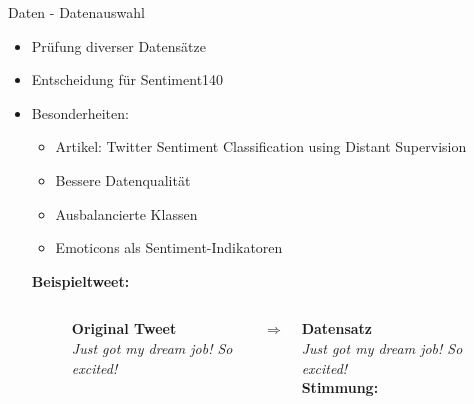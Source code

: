 \documentclass[aspectratio=169]{beamer}
\begin{document}
\begin{frame}{Daten - Datenauswahl}
	\begin{itemize}
		\item Prüfung diverser Datensätze
		\item Entscheidung für \glqq Sentiment140\grqq
		\item Besonderheiten:
		      \begin{itemize}
			      \item Artikel: \glqq Twitter Sentiment Classification using Distant Supervision\grqq
			      \item Bessere Datenqualität
			      \item Ausbalancierte Klassen
			      \item Emoticons als Sentiment-Indikatoren
		      \end{itemize}

		      \vspace{0.5cm}
		      \textbf{Beispieltweet:}
		      \vspace{0.2cm}

		      \begin{figure}
			      \centering
			      \begin{columns}[T]
				      \begin{column}{0.45\textwidth}
					      \centering
					      \textbf{Original Tweet}\\
					      \textit{Just got my dream job! So excited! \yellowhighlight{:)}}
					      \vspace{0.5cm}
				      \end{column}

				      \begin{column}{0.1\textwidth}
					      \centering
					      \LARGE $\Rightarrow$
				      \end{column}

				      \begin{column}{0.45\textwidth}
					      \centering
					      \textbf{Datensatz}\\
					      \textit{Just got my dream job! So excited!} \\
					      \vspace{0.2cm}
					      \textbf{Stimmung: }
					      \vspace{0.5cm}
				      \end{column}
			      \end{columns}
		      \end{figure}

	\end{itemize}
\end{frame}
\end{document}
